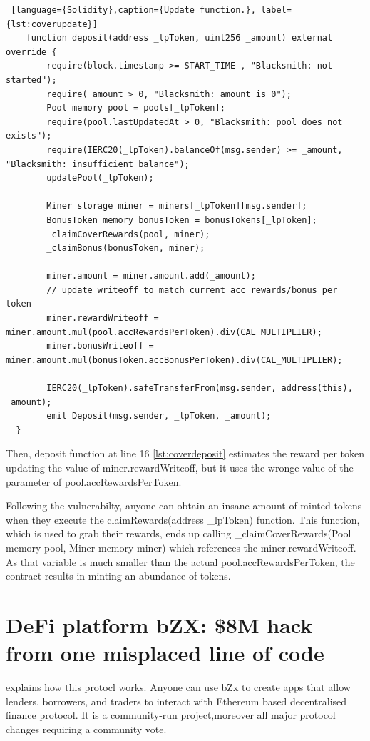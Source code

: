 \begin{lstlisting} [language={Solidity},caption={Update function.}, label={lst:coverupdate}]
    function deposit(address _lpToken, uint256 _amount) external override {
        require(block.timestamp >= START_TIME , "Blacksmith: not started");
        require(_amount > 0, "Blacksmith: amount is 0");
        Pool memory pool = pools[_lpToken];
        require(pool.lastUpdatedAt > 0, "Blacksmith: pool does not exists");
        require(IERC20(_lpToken).balanceOf(msg.sender) >= _amount, "Blacksmith: insufficient balance");
        updatePool(_lpToken);

        Miner storage miner = miners[_lpToken][msg.sender];
        BonusToken memory bonusToken = bonusTokens[_lpToken];
        _claimCoverRewards(pool, miner);
        _claimBonus(bonusToken, miner);

        miner.amount = miner.amount.add(_amount);
        // update writeoff to match current acc rewards/bonus per token
        miner.rewardWriteoff = miner.amount.mul(pool.accRewardsPerToken).div(CAL_MULTIPLIER);
        miner.bonusWriteoff = miner.amount.mul(bonusToken.accBonusPerToken).div(CAL_MULTIPLIER);

        IERC20(_lpToken).safeTransferFrom(msg.sender, address(this), _amount);
        emit Deposit(msg.sender, _lpToken, _amount);
  }
\end{lstlisting}

Then, deposit function at line 16 \autoref{lst:coverdeposit} estimates the reward per token updating the value of miner.rewardWriteoff, 
but it uses the wronge value of the parameter of pool.accRewardsPerToken.

Following the vulnerabilty, anyone can obtain an insane amount of minted tokens when they execute the claimRewards(address \_lpToken) function. 
This function, which is used to grab their rewards, ends up calling \_claimCoverRewards(Pool memory pool, Miner memory miner) which references the miner.rewardWriteoff. 
As that variable is much smaller than the actual pool.accRewardsPerToken, the contract results in minting an abundance of tokens.





\section{DeFi platform bZX: \$8M hack from one misplaced line of code}
\label{sec:Exploits:bZX}

\citet{bZxProtocol} explains how this protocl works. 
Anyone can use bZx to create apps that allow lenders, borrowers, and traders to interact with Ethereum based 
decentralised finance protocol.
It is a community-run project,moreover all major protocol changes requiring a community vote. 

